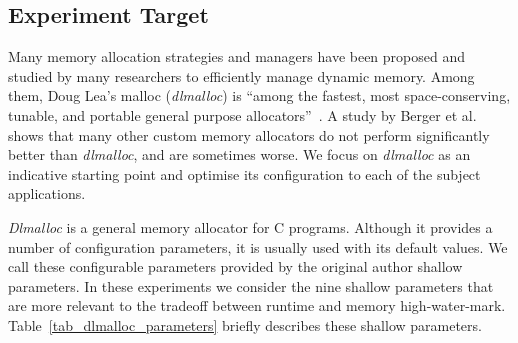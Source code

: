 \subsection{Experiment Target}



Many memory allocation strategies and managers have been proposed and studied by many researchers to efficiently manage dynamic memory. Among them, Doug Lea's malloc (\emph{dlmalloc}) is ``among the fastest, most space-conserving, tunable, and portable general purpose allocators''~\cite{lea1996memory}. A study by Berger et al.~\cite{Berger:2002:RCM:582419.582421} shows that many other custom memory allocators do not perform significantly better than \emph{dlmalloc}, and are sometimes worse. We focus on \emph{dlmalloc} as an indicative starting point and optimise its configuration to each of the subject applications.

\emph{Dlmalloc} is a general memory allocator for C
programs. Although it provides a number of configuration parameters,  
it is usually used with its default values. 
We call these configurable parameters provided by the original author
shallow parameters. In these experiments we consider the nine shallow
parameters that are more relevant to the tradeoff between runtime and
memory high-water-mark. Table~\ref{tab_dlmalloc_parameters} briefly
describes these shallow parameters. 

